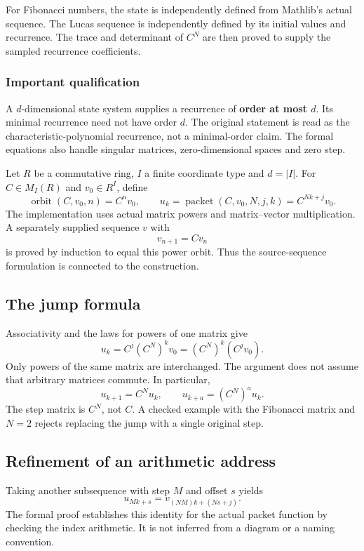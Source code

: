 For Fibonacci numbers, the state is independently defined from Mathlib's actual sequence. The Lucas sequence is independently defined by its initial values and recurrence. The trace and determinant of $C^N$ are then proved to supply the sampled recurrence coefficients.

\subsubsection*{Important qualification}
A $d$-dimensional state system supplies a recurrence of \textbf{order at most $d$}. Its minimal recurrence need not have order $d$. The original statement is read as the characteristic-polynomial recurrence, not a minimal-order claim. The formal equations also handle singular matrices, zero-dimensional spaces and zero step.

\par\medskip
{}
Let $R$ be a commutative ring, $I$ a finite coordinate type and $d=|I|$. For $C\in M_I(R)$ and $v_0\in R^I$, define
\[
 \operatorname{orbit}(C,v_0,n)=C^nv_0,
 \qquad u_k=\operatorname{packet}(C,v_0,N,j,k)=C^{Nk+j}v_0.
\]
The implementation uses actual matrix powers and matrix--vector multiplication. A separately supplied sequence $v$ with
\[
 v_{n+1}=Cv_n
\]
is proved by induction to equal this power orbit. Thus the source-sequence formulation is connected to the construction.

\subsection*{The jump formula}
Associativity and the laws for powers of one matrix give
\[
 \boxed{u_k=C^j(C^N)^kv_0=(C^N)^k(C^jv_0).}
\]
Only powers of the same matrix are interchanged. The argument does not assume that arbitrary matrices commute. In particular,
\[
 u_{k+1}=C^Nu_k,\qquad u_{k+a}=(C^N)^a u_k.
\]
The step matrix is $C^N$, not $C$. A checked example with the Fibonacci matrix and $N=2$ rejects replacing the jump with a single original step.

\subsection*{Refinement of an arithmetic address}
Taking another subsequence with step $M$ and offset $s$ yields
\[
 u_{Mk+s}=v_{(NM)k+(Ns+j)}.
\]
The formal proof establishes this identity for the actual packet function by checking the index arithmetic. It is not inferred from a diagram or a naming convention.

